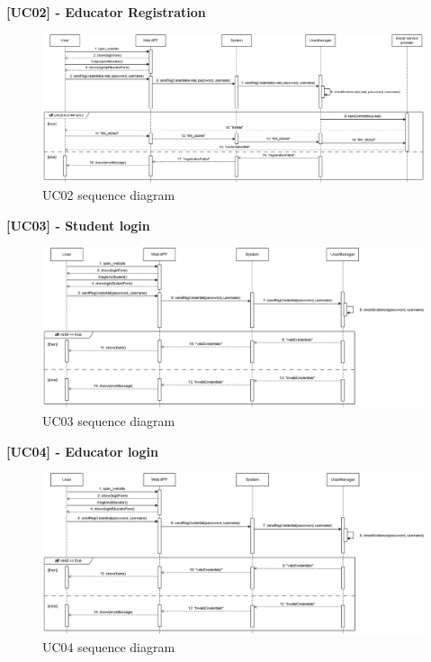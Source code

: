 \textbf{[UC02] - Educator Registration}
\begin{figure}[H]
    \centering
    \includegraphics[width=1\linewidth]{Images/SD_EducatorRegistration.png}
    \caption{UC02 sequence diagram}
    \label{fig:uc02}
\end{figure}

\newpage

\textbf{[UC03] - Student login}
\begin{figure}[H]
    \centering
    \includegraphics[width=1\linewidth]{Images/SD_StudentLogin.png}
    \caption{UC03 sequence diagram}
    \label{fig:uc03}
\end{figure}

\textbf{[UC04] - Educator login}
\begin{figure}[H]
    \centering
    \includegraphics[width=1\linewidth]{Images/SD_EducatorLogin.png}
    \caption{UC04 sequence diagram}
    \label{fig:uc04}
\end{figure}

